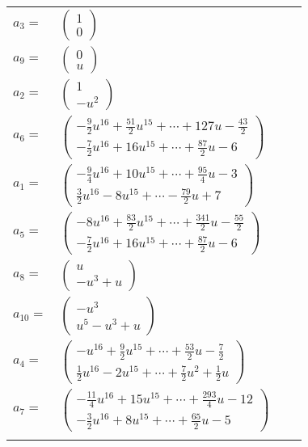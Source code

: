 \documentclass[1p]{elsarticle_modified}
\theoremstyle{definition}
\begin{document}
\begin{tabular}{m{7pt} m{180pt} m{7pt} m{180pt} }
\flushright $a_{3}=$&$\begin{pmatrix}1\\0\end{pmatrix}$ \\
\flushright $a_{9}=$&$\begin{pmatrix}0\\u\end{pmatrix}$ \\
\flushright $a_{2}=$&$\begin{pmatrix}1\\- u^2\end{pmatrix}$ \\
\flushright $a_{6}=$&$\begin{pmatrix}-\frac{9}{2} u^{16}+\frac{51}{2} u^{15}+\cdots+127 u-\frac{43}{2}\\-\frac{7}{2} u^{16}+16 u^{15}+\cdots+\frac{87}{2} u-6\end{pmatrix}$ \\
\flushright $a_{1}=$&$\begin{pmatrix}-\frac{9}{4} u^{16}+10 u^{15}+\cdots+\frac{95}{4} u-3\\\frac{3}{2} u^{16}-8 u^{15}+\cdots-\frac{79}{2} u+7\end{pmatrix}$ \\
\flushright $a_{5}=$&$\begin{pmatrix}-8 u^{16}+\frac{83}{2} u^{15}+\cdots+\frac{341}{2} u-\frac{55}{2}\\-\frac{7}{2} u^{16}+16 u^{15}+\cdots+\frac{87}{2} u-6\end{pmatrix}$ \\
\flushright $a_{8}=$&$\begin{pmatrix}u\\- u^3+u\end{pmatrix}$ \\
\flushright $a_{10}=$&$\begin{pmatrix}- u^3\\u^5- u^3+u\end{pmatrix}$ \\
\flushright $a_{4}=$&$\begin{pmatrix}- u^{16}+\frac{9}{2} u^{15}+\cdots+\frac{53}{2} u-\frac{7}{2}\\\frac{1}{2} u^{16}-2 u^{15}+\cdots+\frac{7}{2} u^2+\frac{1}{2} u\end{pmatrix}$ \\
\flushright $a_{7}=$&$\begin{pmatrix}-\frac{11}{4} u^{16}+15 u^{15}+\cdots+\frac{293}{4} u-12\\-\frac{3}{2} u^{16}+8 u^{15}+\cdots+\frac{65}{2} u-5\end{pmatrix}$\\&\end{tabular}
\end{document}
